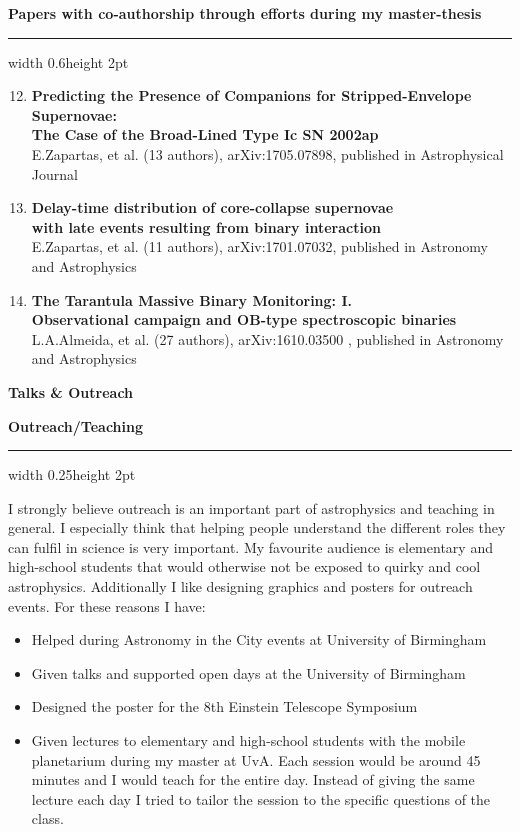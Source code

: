 \documentclass[]{res} %
\begin{document}
{\large \textbf{Papers with co-authorship through efforts during my master-thesis}} 
{\color{lightgray}\hrule width 0.6\textwidth height 2pt}
\begin{enumerate}
\setcounter{enumi}{11}
\item \textbf{Predicting the Presence of Companions for Stripped-Envelope Supernovae: \\ The Case of the Broad-Lined Type Ic SN 2002ap}\\
E.Zapartas, et al. (13 authors), arXiv:1705.07898, published in Astrophysical Journal
\item \textbf{Delay-time distribution of core-collapse supernovae \\ with late events resulting from binary interaction}\\
E.Zapartas, et al. (11 authors), arXiv:1701.07032, published in Astronomy and Astrophysics
\item \textbf{The Tarantula Massive Binary Monitoring: I. \\ Observational campaign and OB-type spectroscopic binaries}\\
L.A.Almeida, et al. (27 authors), arXiv:1610.03500 , published in Astronomy and Astrophysics
\end{enumerate}




\newpage
{\Large{\textbf{Talks \& Outreach}}}

{\large{\textbf{Outreach/Teaching}}}\
{\color{lightgray}\hrule width 0.25\textwidth height 2pt}
\vspace*{7pt}
I strongly believe outreach is an important part of astrophysics and teaching in general. I especially think that helping people understand the different roles they can fulfil in science is very important.
My favourite audience is elementary and high-school students that would otherwise not be exposed to quirky and cool astrophysics. Additionally I like designing graphics and posters for outreach events. For these reasons I have:\\

 \vspace{-10pt}
\begin{itemize}
\item{Helped during Astronomy in the City events at University of Birmingham}
\item{Given talks and supported open days at the University of Birmingham}
\item{Designed the poster for the 8th Einstein Telescope Symposium}
\item{Given lectures to elementary and high-school students with the mobile planetarium
  during my master at UvA. Each session would be around 45 minutes and I would teach for the entire day. Instead of giving the same lecture each day I tried to tailor the session
  to the specific questions of the class.}
\end{itemize}
\end{document}
